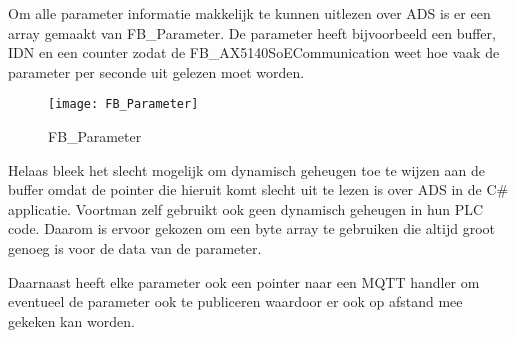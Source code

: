 Om alle parameter informatie makkelijk te kunnen uitlezen over ADS is er een array gemaakt van FB\_Parameter. De parameter heeft bijvoorbeeld een buffer, IDN en een counter zodat de FB\_AX5140SoECommunication weet hoe vaak de parameter per seconde uit gelezen moet worden.

\begin{figure}[H]
	\centering
	\texttt{[image: FB\_Parameter]}
	\label{fig:FB_Parameter}
	\caption{FB\_Parameter}
\end{figure}

Helaas bleek het slecht mogelijk om dynamisch geheugen toe te wijzen aan de buffer omdat de pointer die hieruit komt slecht uit te lezen is over ADS in de C\# applicatie. Voortman zelf gebruikt ook geen dynamisch geheugen in hun PLC code. Daarom is ervoor gekozen om een byte array te gebruiken die altijd groot genoeg is voor de data van de parameter.

\vspace{0.5cm}

Daarnaast heeft elke parameter ook een pointer naar een MQTT handler om eventueel de parameter ook te publiceren waardoor er ook op afstand mee gekeken kan worden.

